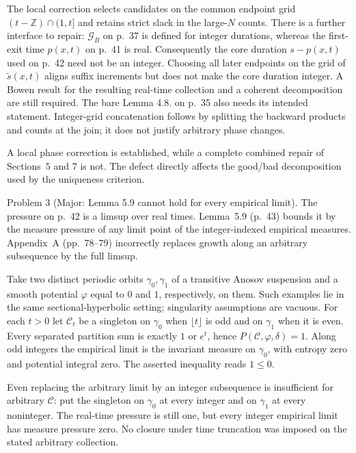 \documentclass[10pt]{article}
\begin{document}
The local correction selects candidates on the common endpoint grid \((t-\mathbb Z)\cap(1,t]\) and retains strict slack in the large-\(N\) counts. There is a further interface to repair: \(\mathcal G_B\) on p. 37 is defined for integer durations, whereas the first-exit time \(p(x,t)\) on p. 41 is real. Consequently the core duration \(s-p(x,t)\) used on p. 42 need not be an integer. Choosing all later endpoints on the grid of \(\widetilde s(x,t)\) aligns suffix increments but does not make the core duration integer. A Bowen result for the resulting real-time collection and a coherent decomposition are still required. The bare Lemma 4.8. on p. 35 also needs its intended statement. Integer-grid concatenation follows by splitting the backward products and counts at the join; it does not justify arbitrary phase changes.\par
A local phase correction is established, while a complete combined repair of Sections 5 and 7 is not. The defect directly affects the good/bad decomposition used by the uniqueness criterion.\par
Problem 3 (Major: Lemma 5.9 cannot hold for every empirical limit).  The pressure on p. 42 is a limsup over real times. Lemma 5.9 (p. 43) bounds it by the measure pressure of any limit point of the integer-indexed empirical measures. Appendix A (pp. 78–79) incorrectly replaces growth along an arbitrary subsequence by the full limsup.\par
Take two distinct periodic orbits \(\gamma_0,\gamma_1\) of a transitive Anosov suspension and a smooth potential \(\varphi\) equal to \(0\) and \(1\), respectively, on them. Such examples lie in the same sectional-hyperbolic setting; singularity assumptions are vacuous. For each \(t>0\) let \(\mathcal C_t\) be a singleton on \(\gamma_0\) when \(\lfloor t\rfloor\) is odd and on \(\gamma_1\) when it is even. Every separated partition sum is exactly \(1\) or \(e^t\), hence \(P(\mathcal C,\varphi,\delta)=1\). Along odd integers the empirical limit is the invariant measure on \(\gamma_0\), with entropy zero and potential integral zero. The asserted inequality reads \(1\le0\).\par
Even replacing the arbitrary limit by an integer subsequence is insufficient for arbitrary \(\mathcal C\): put the singleton on \(\gamma_0\) at every integer and on \(\gamma_1\) at every noninteger. The real-time pressure is still one, but every integer empirical limit has measure pressure zero. No closure under time truncation was imposed on the stated arbitrary collection.\par
\end{document}
